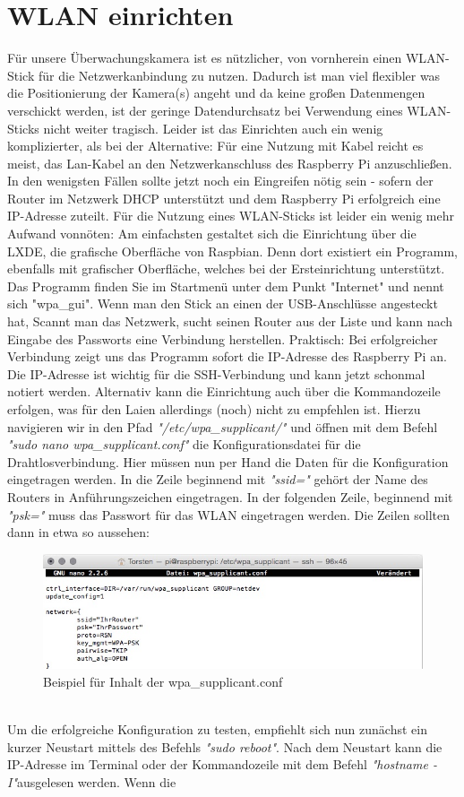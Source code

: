 \documentclass[12pt,a4paper]{scrreprt}
\begin{document}
\section{WLAN einrichten}
Für unsere Überwachungskamera ist es nützlicher, von vornherein einen WLAN-Stick für die Netzwerkanbindung zu nutzen. Dadurch ist man viel flexibler was die Positionierung der Kamera(s) angeht und da keine großen Datenmengen verschickt werden, ist der geringe Datendurchsatz bei Verwendung eines WLAN-Sticks nicht weiter tragisch. Leider ist das Einrichten auch ein wenig komplizierter, als bei der Alternative: Für eine Nutzung mit Kabel reicht es meist, das Lan-Kabel an den Netzwerkanschluss des Raspberry Pi anzuschließen. In den wenigsten Fällen sollte jetzt noch ein Eingreifen nötig sein - sofern der Router im Netzwerk DHCP unterstützt und dem Raspberry Pi erfolgreich eine IP-Adresse zuteilt. Für die Nutzung eines WLAN-Sticks ist leider ein wenig mehr Aufwand vonnöten: Am einfachsten gestaltet sich die Einrichtung über die LXDE, die grafische Oberfläche von Raspbian. Denn dort existiert ein Programm, ebenfalls mit grafischer Oberfläche, welches bei der Ersteinrichtung unterstützt. Das Programm finden Sie im Startmenü unter dem Punkt "Internet" und nennt sich "wpa\_gui". Wenn man den Stick an einen der USB-Anschlüsse angesteckt hat, Scannt man das Netzwerk, sucht seinen Router aus der Liste und kann nach Eingabe des Passworts eine Verbindung herstellen. Praktisch: Bei erfolgreicher Verbindung zeigt uns das Programm sofort die IP-Adresse des Raspberry Pi an. Die IP-Adresse ist wichtig für die SSH-Verbindung und kann jetzt schonmal notiert werden. Alternativ kann die Einrichtung auch über die Kommandozeile erfolgen, was für den Laien allerdings (noch) nicht zu empfehlen ist. Hierzu navigieren wir in den Pfad \textit{"/etc/wpa\_supplicant/"} und öffnen mit dem Befehl \textit{"sudo nano wpa\_supplicant.conf"} die Konfigurationsdatei für die Drahtlosverbindung. Hier müssen nun per Hand die Daten für die Konfiguration eingetragen werden. In die Zeile beginnend mit \textit{"ssid="} gehört der Name des Routers in Anführungszeichen eingetragen. In der folgenden Zeile, beginnend mit \textit{"psk="} muss das Passwort für das WLAN eingetragen werden. Die Zeilen sollten dann in etwa so aussehen:\\ \begin{figure}[h] \includegraphics[width=15.8cm]{wpa} \caption{Beispiel für Inhalt der wpa\_supplicant.conf} \end{figure} \\ Um die erfolgreiche Konfiguration zu testen, empfiehlt sich nun zunächst ein kurzer Neustart mittels des Befehls \textit{"sudo reboot"}. Nach dem Neustart kann die IP-Adresse im Terminal oder der Kommandozeile mit dem Befehl \textit{"hostname -I"}ausgelesen werden. Wenn die 
\end{document}
